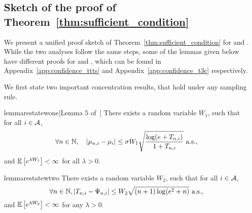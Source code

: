 % 

\subsection{Sketch of the proof of Theorem~\ref{thm:sufficient_condition}}

We present a unified proof sketch of Theorem~\ref{thm:sufficient_condition} for \TTTS and \TCC. While the two analyses follow the same steps, some of the lemmas given below have different proofs for \TTTS and \TCC, which can be found in Appendix~\ref{app:confidence_ttts} and Appendix~\ref{app:confidence_t3c} respectively.

We first state two important concentration results, that hold under any sampling rule. 

\begin{restatable}{lemma}{restatewone}[Lemma 5 of~\citealt{qin2017ttei}]\label{lemma:means}
    There exists a random variable $W_1$, such that for all $i\in\mathcal{A}$,
    \[
        \forall n\in{\mathbb N}, \quad |\mu_{n,i} - \mu_{i}| \leq \sigma W_1 \sqrt{\frac{\log(e+T_{n,i})}{1+T_{n,i}}} \text{ a.s.},
    \]
    and $\mathbb{E}\left[e^{\lambda W_1}\right] < \infty$ for all $\lambda > 0$.
\end{restatable}

\begin{restatable}{lemma}{restatewtwo}\label{lemma:link}
There exists a random variable $W_2$, such that for all $i\in\mathcal{A}$,
    \[
        \forall n\in{\mathbb N}, |T_{n,i}-\Psi_{n,i}| \leq W_2\sqrt{(n+1)\log(e^2+n)} \text{ a.s.},
    \]
and $\mathbb{E}\left[e^{\lambda W_2}\right] < \infty$ for any $\lambda > 0$.
\end{restatable}

